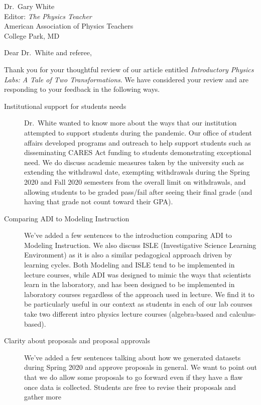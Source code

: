 \documentclass{letter}
\begin{document}
\begin{letter}{Dr.\ Gary White \\ Editor: \textit{The Physics Teacher} \\ American Association
    of Physics Teachers \\ College Park, MD}

  \opening{Dear Dr.\ White and referee,}

  Thank you for your thoughtful review of our article entitled \textit{Introductory Physics
    Labs: A Tale of Two Transformations}. We have considered your review and are responding to
  your feedback in the following ways.

  \begin{description}
    \item[Institutional support for students needs] Dr.\ White wanted to know more about the
    ways that our institution attempted to support students during the pandemic.  Our office of
    student affairs developed programs and outreach to help support students such as
    disseminating CARES Act funding to students demonstrating exceptional need.  We do discuss
    academic measures taken by the university such as extending the withdrawal date, exempting
    withdrawals during the Spring 2020 and Fall 2020 semesters from the overall limit on
    withdrawals, and allowing students to be graded pass/fail after seeing their final grade
    (and having that grade not count toward their GPA).
    \item[Comparing ADI to Modeling Instruction] We've added a few sentences to the
    introduction comparing ADI to Modeling Instruction.  We also discuss ISLE (Investigative
    Science Learning Environment) as it is also a similar pedagogical approach driven by
    learning cycles.  Both Modeling and ISLE tend to be implemented in lecture courses, while
    ADI was designed to mimic the ways that scientists learn in the laboratory, and has been
    designed to be implemented in laboratory courses regardless of the approach used in
    lecture. We find it to be particularly useful in our context as students in each of our lab
    courses take two different intro physics lecture courses (algebra-based and calculus-based).
    \item[Clarity about proposals and proposal approvals] We've added a few sentences talking
    about how we generated datasets during Spring 2020 and approve proposals in general. We
    want to point out that we do allow some proposals to go forward even if they have a flaw
    once data is collected.  Students are free to revise their proposals and gather more

\end{description}
\end{letter}
\end{document}
